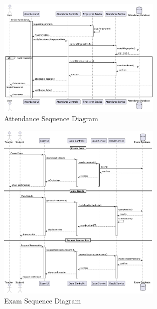 \documentclass[12pt,a4paper]{report}
\begin{document}
\begin{figure}[htbp]
    \centering
    \includegraphics[width=0.7\textwidth]{attendance-sequence.png}
    \caption{Attendance Sequence Diagram}
    \label{fig:attendance-sequence}
\end{figure}

\begin{figure}[htbp]
    \centering
    \includegraphics[width=0.7\textwidth]{exam-sequence.png}
    \caption{Exam Sequence Diagram}
    \label{fig:exam-sequence}
\end{figure}
\end{document}
